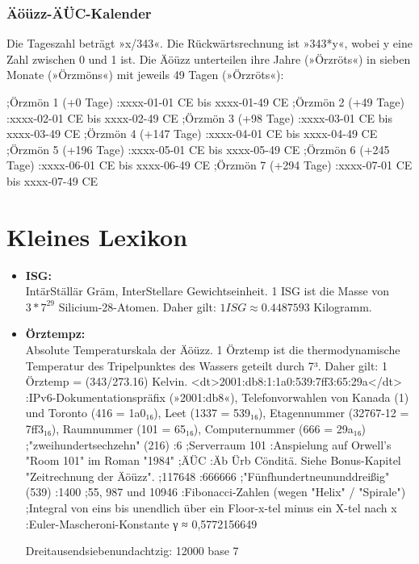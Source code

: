 \subsection{Äöüzz-ÄÜC-Kalender}

Die Tageszahl beträgt »x/343«. Die Rückwärtsrechnung ist »343*y«, wobei y eine Zahl zwischen 0 und 1 ist. Die Äöüzz unterteilen ihre Jahre (»Örzröts«) in sieben Monate (»Örzmöns«) mit jeweils 49 Tagen (»Örzröts«):

;Örzmön 1 (+0 Tage)
:xxxx-01-01 CE bis xxxx-01-49 CE
;Örzmön 2 (+49 Tage)
:xxxx-02-01 CE bis xxxx-02-49 CE
;Örzmön 3 (+98 Tage)
:xxxx-03-01 CE bis xxxx-03-49 CE
;Örzmön 4 (+147 Tage)
:xxxx-04-01 CE bis xxxx-04-49 CE
;Örzmön 5 (+196 Tage)
:xxxx-05-01 CE bis xxxx-05-49 CE
;Örzmön 6 (+245 Tage)
:xxxx-06-01 CE bis xxxx-06-49 CE
;Örzmön 7 (+294 Tage)
:xxxx-07-01 CE bis xxxx-07-49 CE



\chapter{Kleines Lexikon}

\begin{itemize}
    \item \textbf{ISG:}\\ IntärStällär Gräm, InterStellare Gewichtseinheit. 1 ISG ist die Masse von $3*7^{29}$ Silicium-28-Atomen. Daher gilt: $1 ISG ≈ 0.4487593$ Kilogramm.
    \item \textbf{Örztempz:}\\ Absolute Temperaturskala der Äöüzz. 1 Örztemp ist die thermodynamische Temperatur des Tripelpunktes des Wassers geteilt durch 7³. Daher gilt: 1 Örztemp = (343/273.16) Kelvin.
<dt>2001:db8:1:1a0:539:7ff3:65:29a</dt>
:IPv6-Dokumentationspräfix (»2001:db8«), Telefonvorwahlen von Kanada (1) und Toronto (416 = 1a0₁₆), Leet (1337 = 539₁₆), Etagennummer (32767-12 = 7ff3₁₆), Raumnummer (101 = 65₁₆), Computernummer (666 = 29a₁₆)
;"zweihundertsechzehn" (216)
:6
;Serverraum 101
:Anspielung auf Orwell's "Room 101" im Roman "1984"
;ÄÜC
:Äb Ürb Cönditä. Siehe Bonus-Kapitel "Zeitrechnung der Äöüzz".
;117648
:666666
;"Fünfhundertneununddreißig" (539)
:1400
;55, 987 und 10946
:Fibonacci-Zahlen (wegen "Helix" / "Spirale")
;Integral von eins bis unendlich über ein Floor-x-tel minus ein X-tel nach x
:Euler-Mascheroni-Konstante γ ≈ 0,5772156649

Dreitausendsiebenundachtzig: 12000 base 7

\end{itemize}


